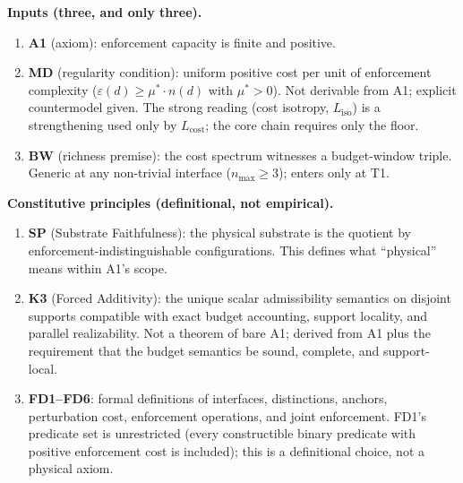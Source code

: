 \documentclass[11pt,a4paper]{article}
\theoremstyle{definition}
\newcommand{\eps}{\varepsilon}
\begin{document}
\medskip
\begin{tcolorbox}[apfbox, title={What Is Assumed, What Is Proved, What Is Deferred}]
\textbf{Inputs (three, and only three).}
\begin{enumerate}[nosep,label=\arabic*.,leftmargin=2em]
\item \textbf{A1} (axiom): enforcement capacity is finite and positive.
\item \textbf{MD} (regularity condition): uniform positive cost per unit of enforcement complexity ($\eps(d) \ge \mu^* \cdot n(d)$ with $\mu^* > 0$).  Not derivable from A1; explicit countermodel given.  The strong reading (cost isotropy, $L_{\mathrm{iso}}$) is a strengthening used only by $L_{\mathrm{cost}}$; the core chain requires only the floor.
\item \textbf{BW} (richness premise): the cost spectrum witnesses a budget-window triple.  Generic at any non-trivial interface ($n_{\max} \ge 3$); enters only at T1.
\end{enumerate}

\smallskip\noindent\textbf{Constitutive principles (definitional, not empirical).}
\begin{enumerate}[nosep,label=\arabic*.,leftmargin=2em]
\item \textbf{SP} (Substrate Faithfulness): the physical substrate is the quotient by enforcement-indistinguishable configurations.  This defines what ``physical'' means within A1's scope.
\item \textbf{K3} (Forced Additivity): the unique scalar admissibility semantics on disjoint supports compatible with exact budget accounting, support locality, and parallel realizability.  Not a theorem of bare A1; derived from A1 plus the requirement that the budget semantics be sound, complete, and support-local.
\item \textbf{FD1--FD6}: formal definitions of interfaces, distinctions, anchors, perturbation cost, enforcement operations, and joint enforcement.  FD1's predicate set is unrestricted (every constructible binary predicate with positive enforcement cost is included); this is a definitional choice, not a physical axiom.
\end{enumerate}


\end{tcolorbox}
\end{document}
